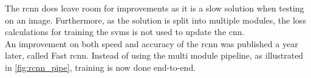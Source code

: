 The \gls{rcnn} does leave room for improvements as it is a slow solution when testing on an image. Furthermore, as the solution is split into multiple modules, the loss calculations for training the \gls{svm}s is not used to update the \gls{cnn}.\\

An improvement on both speed and accuracy of the \gls{rcnn} was published a year later, called Fast \gls{rcnn}. Instead of using the multi module pipeline, as illustrated in \autoref{fig:rcnn_pipe}, training is now done end-to-end.

%
%
%
%
